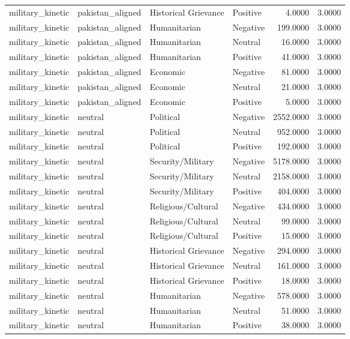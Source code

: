 \begin{longtable}{llllrr}
military\_kinetic & pakistan\_aligned & Historical Grievance & Positive & 4.0000 & 3.0000 \\
military\_kinetic & pakistan\_aligned & Humanitarian & Negative & 199.0000 & 3.0000 \\
military\_kinetic & pakistan\_aligned & Humanitarian & Neutral & 16.0000 & 3.0000 \\
military\_kinetic & pakistan\_aligned & Humanitarian & Positive & 41.0000 & 3.0000 \\
military\_kinetic & pakistan\_aligned & Economic & Negative & 81.0000 & 3.0000 \\
military\_kinetic & pakistan\_aligned & Economic & Neutral & 21.0000 & 3.0000 \\
military\_kinetic & pakistan\_aligned & Economic & Positive & 5.0000 & 3.0000 \\
military\_kinetic & neutral & Political & Negative & 2552.0000 & 3.0000 \\
military\_kinetic & neutral & Political & Neutral & 952.0000 & 3.0000 \\
military\_kinetic & neutral & Political & Positive & 192.0000 & 3.0000 \\
military\_kinetic & neutral & Security/Military & Negative & 5178.0000 & 3.0000 \\
military\_kinetic & neutral & Security/Military & Neutral & 2158.0000 & 3.0000 \\
military\_kinetic & neutral & Security/Military & Positive & 404.0000 & 3.0000 \\
military\_kinetic & neutral & Religious/Cultural & Negative & 434.0000 & 3.0000 \\
military\_kinetic & neutral & Religious/Cultural & Neutral & 99.0000 & 3.0000 \\
military\_kinetic & neutral & Religious/Cultural & Positive & 15.0000 & 3.0000 \\
military\_kinetic & neutral & Historical Grievance & Negative & 294.0000 & 3.0000 \\
military\_kinetic & neutral & Historical Grievance & Neutral & 161.0000 & 3.0000 \\
military\_kinetic & neutral & Historical Grievance & Positive & 18.0000 & 3.0000 \\
military\_kinetic & neutral & Humanitarian & Negative & 578.0000 & 3.0000 \\
military\_kinetic & neutral & Humanitarian & Neutral & 51.0000 & 3.0000 \\
military\_kinetic & neutral & Humanitarian & Positive & 38.0000 & 3.0000 \\

\end{longtable}
